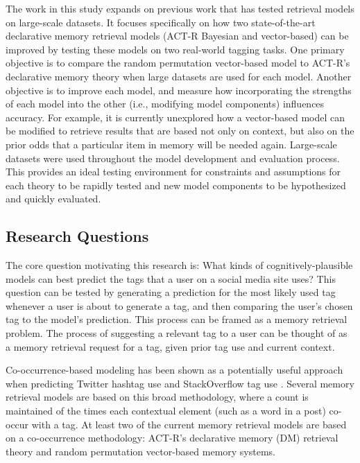 \documentclass[man,donotrepeattitle]{apa6}
\begin{document}
The work in this study expands on previous work that has tested retrieval models on large-scale datasets.
It focuses specifically on how two state-of-the-art declarative memory retrieval models (ACT-R Bayesian and vector-based) can be improved by testing these models on two real-world tagging tasks.
One primary objective is to compare the random permutation vector-based model to ACT-R's declarative memory theory when large datasets are used for each model. 
Another objective is to improve each model, and measure how incorporating the strengths of each model into the other (i.e., modifying model components) influences accuracy.
For example, it is currently unexplored how a vector-based model can be modified to retrieve results that are based not only on context, but also on the prior odds that a particular item in memory will be needed again.
Large-scale datasets were used throughout the model development and evaluation process.
This provides an ideal testing environment for constraints and assumptions for each theory to be rapidly tested and new model components to be hypothesized and quickly evaluated.

\subsection{Research Questions}

The core question motivating this research is:
What kinds of cognitively-plausible models can best predict the tags that a user on a social media site uses?
This question can be tested by generating a prediction for the most likely used tag whenever a user is about to generate a tag, and then comparing the user's chosen tag to the model's prediction.
This process can be framed as a memory retrieval problem.
The process of suggesting a relevant tag to a user can be thought of as a memory retrieval request for a tag, given prior tag use and current context.

Co-occurrence-based modeling has been shown as a potentially useful approach when predicting Twitter hashtag use \parencite{Efron2010} and StackOverflow tag use \parencites{Stanley2013}.
Several memory retrieval models are based on this broad methodology, where a count is maintained of the times each contextual element (such as a word in a post) co-occur with a tag.
At least two of the current memory retrieval models are based on a co-occurrence methodology:
ACT-R's declarative memory (DM) retrieval theory and random permutation vector-based memory systems.
\end{document}
